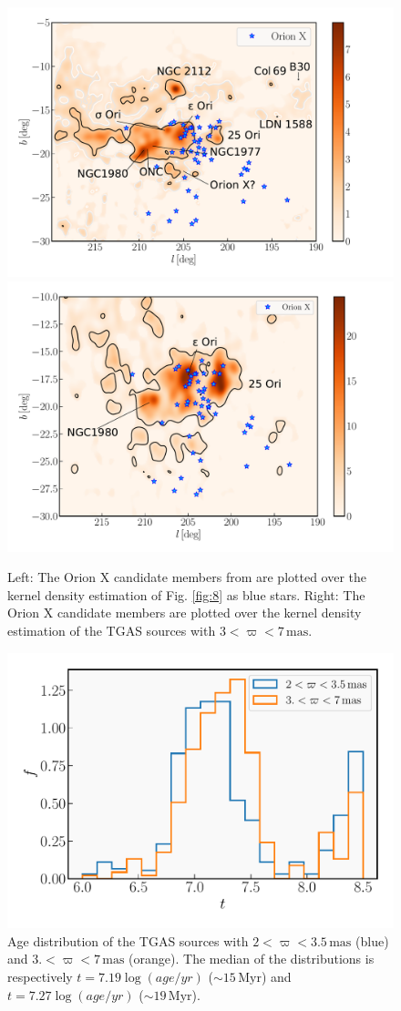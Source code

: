 \documentclass[twocolumn]{aa}
\begin{document}
\begin{figure}
\includegraphics[width = 0.5\hsize]{orionX.pdf} %
\vspace{0.1cm}
\includegraphics[width = 0.5\hsize]{kdeOrionX2.pdf} 
\caption{Left: The Orion X candidate members from \cite{Bouy2015} are plotted over the kernel density estimation of Fig. \ref{fig:8} as blue stars. Right: The Orion X candidate members are plotted over the kernel density estimation of the TGAS sources with $3 < \varpi < 7 \, \mathrm{mas}$.}
\label{fig:11}
\end{figure}


\begin{figure}
\includegraphics[width = \hsize]{agesForeground.pdf}
\caption{Age distribution of the TGAS sources with $2 < \varpi < 3.5 \, \mathrm{mas}$ (blue) and $3. < \varpi < 7 \, \mathrm{mas}$ (orange). The median of the distributions is respectively $t = 7.19 \log(age/yr)$ ($\sim 15 \, \mathrm{Myr}$) and $t = 7.27  \log(age/yr)$ ($\sim 19 \, \mathrm{Myr}$).}
\label{fig:11b}
\end{figure}
\end{document}
